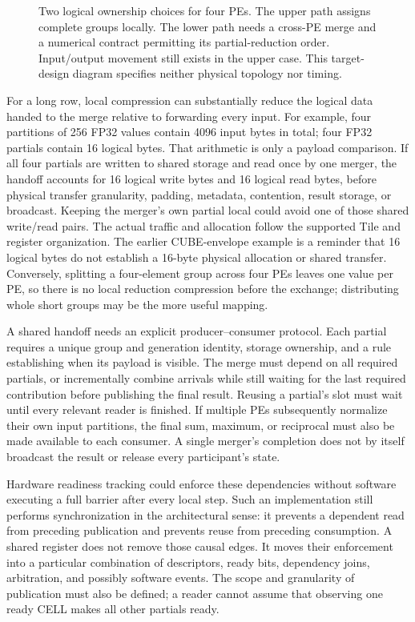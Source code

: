 \begin{figure}[tb]
\centering

\caption{Two logical ownership choices for four PEs. The upper path assigns complete groups locally. The lower path needs a cross-PE merge and a numerical contract permitting its partial-reduction order. Input/output movement still exists in the upper case. This target-design diagram specifies neither physical topology nor timing.}
\label{fig:u005-pe-ownership}
\end{figure}

For a long row, local compression can substantially reduce the logical data handed to the merge relative to forwarding every input. For example, four partitions of 256 FP32 values contain 4096 input bytes in total; four FP32 partials contain 16 logical bytes. That arithmetic is only a payload comparison. If all four partials are written to shared storage and read once by one merger, the handoff accounts for 16 logical write bytes and 16 logical read bytes, before physical transfer granularity, padding, metadata, contention, result storage, or broadcast. Keeping the merger's own partial local could avoid one of those shared write/read pairs. The actual traffic and allocation follow the supported Tile and register organization. The earlier CUBE-envelope example is a reminder that 16 logical bytes do not establish a 16-byte physical allocation or shared transfer. Conversely, splitting a four-element group across four PEs leaves one value per PE, so there is no local reduction compression before the exchange; distributing whole short groups may be the more useful mapping.

A shared handoff needs an explicit producer--consumer protocol. Each partial requires a unique group and generation identity, storage ownership, and a rule establishing when its payload is visible. The merge must depend on all required partials, or incrementally combine arrivals while still waiting for the last required contribution before publishing the final result. Reusing a partial's slot must wait until every relevant reader is finished. If multiple PEs subsequently normalize their own input partitions, the final sum, maximum, or reciprocal must also be made available to each consumer. A single merger's completion does not by itself broadcast the result or release every participant's state.

Hardware readiness tracking could enforce these dependencies without software executing a full barrier after every local step. Such an implementation still performs synchronization in the architectural sense: it prevents a dependent read from preceding publication and prevents reuse from preceding consumption. A shared register does not remove those causal edges. It moves their enforcement into a particular combination of descriptors, ready bits, dependency joins, arbitration, and possibly software events. The scope and granularity of publication must also be defined; a reader cannot assume that observing one ready CELL makes all other partials ready.

